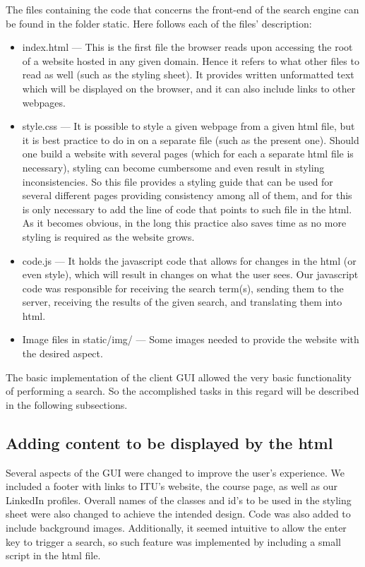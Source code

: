 The files containing the code that concerns the front-end of the search engine can be found in the folder static. Here follows each of the files' description:
\begin{itemize}
    \item index.html — This is the first file the browser reads upon accessing the root of a website hosted in any given domain. Hence it refers to what other files to read as well (such as the styling sheet). It provides written unformatted text which will be displayed on the browser, and it can also include links to other webpages.
    \item style.css — It is possible to style a given webpage from a given html file, but it is best practice to do in on a separate file (such as the present one). Should one build a website with several pages (which for each a separate html file is necessary), styling can become cumbersome and even result in styling inconsistencies. So this file provides a styling guide that can be used for several different pages providing consistency among all of them, and for this is only necessary to add the line of code that points to such file in the html. As it becomes obvious, in the long this practice also saves time as no more styling is required as the website grows.
    \item code.js — It holds the javascript code that allows for changes in the html (or even style), which will result in changes on what the user sees. Our javascript code was responsible for receiving the search term(s), sending them to the server, receiving the results of the given search, and translating them into html.
    \item Image files in static/img/ — Some images needed to provide the website with the desired aspect.
\end{itemize}
The basic implementation of the client GUI allowed the very basic functionality of performing a search. So the accomplished tasks in this regard will be described in the following subsections.

\subsection{Adding content to be displayed by the html}
Several aspects of the GUI were changed to improve the user's experience. We included a footer with links to ITU's website, the course page, as well as our LinkedIn profiles. Overall names of the classes and id's to be used in the styling sheet were also changed to achieve the intended design. Code was also added to include background images.
Additionally, it seemed intuitive to allow the enter key to trigger a search, so such feature was implemented by including a small script in the html file.

